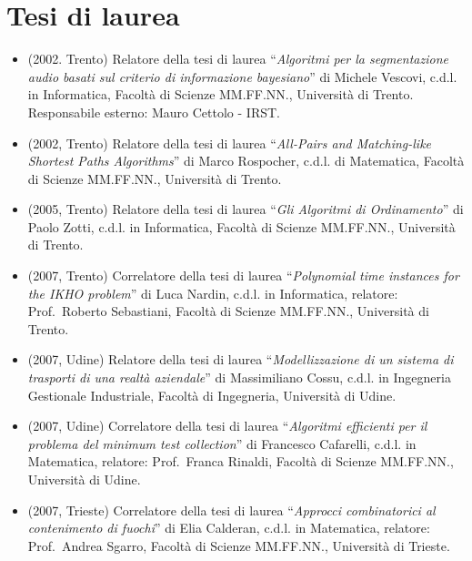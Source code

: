 \documentclass[11pt]{article}
\begin{document}
\section{Tesi di laurea}
\begin{itemize}

\item (2002. Trento) Relatore della tesi di laurea 
``{\em Algoritmi per la segmentazione
audio basati sul criterio di informazione bayesiano}''  
di Michele Vescovi, c.d.l. in Informatica, Facolt\`{a} 
di Scienze MM.FF.NN., Universit\`{a} di Trento.
Responsabile esterno: Mauro Cettolo - IRST. 

\item (2002, Trento) Relatore della tesi di laurea 
``{\em All-Pairs and Matching-like
Shortest Paths Algorithms}''
di Marco Rospocher, c.d.l. di Matematica, Facolt\`{a} 
di Scienze MM.FF.NN., Universit\`{a} di Trento. 

\item (2005, Trento) Relatore della tesi di laurea 
``{\em Gli Algoritmi di Ordinamento}''
di Paolo Zotti, c.d.l. in Informatica, Facolt\`{a} 
di Scienze MM.FF.NN., Universit\`{a} di Trento.

\item (2007, Trento) Correlatore della tesi di laurea 
``{\em Polynomial time instances for the IKHO problem}''
di Luca Nardin, c.d.l. in Informatica,
relatore: Prof.~Roberto Sebastiani, Facolt\`{a} 
di Scienze MM.FF.NN., Universit\`{a} di Trento.

\item (2007, Udine) Relatore della tesi di laurea 
``{\em Modellizzazione di un sistema di trasporti di una realt\`a aziendale}''
di Massimiliano Cossu, c.d.l. in Ingegneria Gestionale Industriale,
Facolt\`{a} di Ingegneria, Universit\`{a} di Udine.

\item (2007, Udine) Correlatore della tesi di laurea 
``{\em Algoritmi efficienti per il problema del minimum test collection}''
di Francesco Cafarelli, c.d.l. in Matematica,
relatore: Prof.~Franca Rinaldi,
Facolt\`{a} di Scienze MM.FF.NN., Universit\`{a} di Udine.

\item (2007, Trieste) Correlatore della tesi di laurea 
``{\em Approcci combinatorici al contenimento di fuochi}''
di Elia Calderan, c.d.l. in Matematica,
relatore: Prof.~Andrea Sgarro,
Facolt\`{a} di Scienze MM.FF.NN., Universit\`{a} di Trieste.

\end{itemize}
\end{document}
